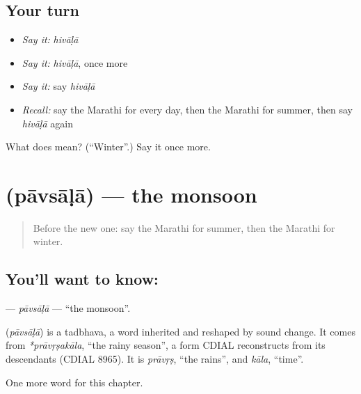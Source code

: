 \subsection*{Your turn}
\begin{itemize}
\raggedright
  \item \emph{Say it:} \emph{hivāḷā}
  \item \emph{Say it:} \emph{hivāḷā}, once more
  \item \emph{Say it:} say \emph{hivāḷā}
  \item \emph{Recall:} say the Marathi for every day, then the Marathi for summer, then say \emph{hivāḷā} again
\end{itemize}

\begin{tcolorbox}[breakable,colback=teal!4,colframe=teal!35!black,title={Before you move on}]
What does  mean? (\textquotedblleft{}Winter\textquotedblright{}.) Say it once more.
\end{tcolorbox}
\section[\texorpdfstring{\mr{पावसाळा} (pāvsāḷā)}{पावसाळा (pāvsāḷā)}]{ (pāvsāḷā) — the monsoon}

\label{lesson:MR-C127-pavsala}



\begin{quote}
Before the new one: say the Marathi for summer, then the Marathi for winter.
\end{quote}

\subsection*{You'll want to know: }
\textbf{} — \emph{pāvsāḷā} — \textquotedblleft{}the monsoon\textquotedblright{}.

\begin{cousinweb}
\textbf{} (\emph{pāvsāḷā}) is a tadbhava, a word inherited and reshaped by sound change. It comes from \emph{*prāvṛṣakāla}, \textquotedblleft{}the rainy season\textquotedblright{}, a form CDIAL reconstructs from its descendants (CDIAL 8965). It is \emph{prāvṛṣ}, \textquotedblleft{}the rains\textquotedblright{}, and \emph{kāla}, \textquotedblleft{}time\textquotedblright{}.
\end{cousinweb}

\begin{grammarlens}[title={What you've built}]
One more word for this chapter.
\end{grammarlens}

